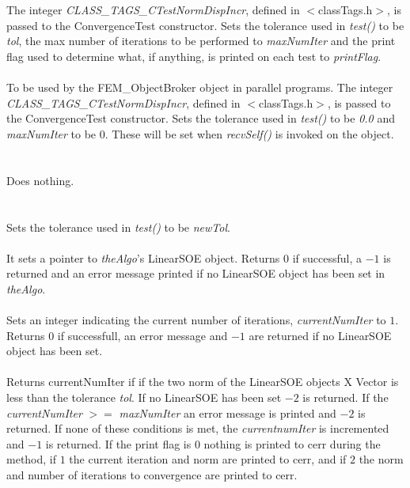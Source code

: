   \\
  \\
The integer {\em CLASS\_TAGS\_CTestNormDispIncr}, defined in
$<$classTags.h$>$, is passed to the ConvergenceTest constructor. Sets
the tolerance used in {\em test()} to be {\em tol}, the max number
of iterations to be performed to {\em maxNumIter} and the print
flag used to determine what, if anything, is printed on each test to
{\em printFlag}. \\


  \\
To be used by the FEM\_ObjectBroker object in parallel programs. The
integer {\em CLASS\_TAGS\_CTestNormDispIncr}, defined in
$<$classTags.h$>$, is passed to the ConvergenceTest constructor. Sets
the tolerance used in {\em test()} to be {\em 0.0} and {\em maxNumIter} 
to be $0$. These will be set when {\em recvSelf()} is invoked on the object. \\


 \\
 \\ 
Does nothing. \\

  \\
 \\
Sets the tolerance used in {\em test()} to be {\em newTol}. \\

 \\
It sets a pointer to {\em theAlgo}'s LinearSOE object. Returns $0$ if
successful, a $-1$ is returned and an error message printed if no
LinearSOE object has been set in {\em theAlgo}. \\

 \\
Sets an integer indicating the current number of iterations, {\em
currentNumIter} to $1$. Returns $0$ if successfull, an error message
and $-1$ are returned if no LinearSOE object has been set. \\

 \\
Returns {currentNumIter} if if the two norm of the LinearSOE objects X
Vector is less than the tolerance {\em tol}. If no LinearSOE has been
set $-2$ is returned. If the {\em currentNumIter} $>=$ {\em
maxNumIter} an error message is printed and $-2$ is returned. If none
of these conditions is met, the {\em currentnumIter} is incremented
and $-1$ is returned. If the print flag is $0$ nothing is printed to
cerr during the method, if $1$ the current iteration and norm are
printed to cerr, and if $2$ the norm and number of iterations to convergence
are printed to cerr. \\ 


